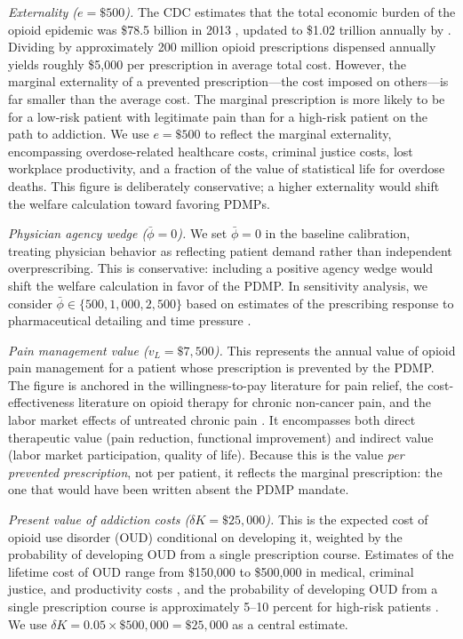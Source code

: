 \documentclass[12pt]{article}
\begin{document}
\textit{Externality ($e = \$500$).} The CDC estimates that the total economic burden of the opioid epidemic was \$78.5 billion in 2013 \citep{florence2016economic}, updated to \$1.02 trillion annually by \citet{florence2021economic}. Dividing by approximately 200 million opioid prescriptions dispensed annually yields roughly \$5,000 per prescription in average total cost. However, the marginal externality of a prevented prescription---the cost imposed on others---is far smaller than the average cost. The marginal prescription is more likely to be for a low-risk patient with legitimate pain than for a high-risk patient on the path to addiction. We use $e = \$500$ to reflect the marginal externality, encompassing overdose-related healthcare costs, criminal justice costs, lost workplace productivity, and a fraction of the value of statistical life for overdose deaths. This figure is deliberately conservative; a higher externality would shift the welfare calculation toward favoring PDMPs.

\textit{Physician agency wedge ($\bar{\phi} = 0$).} We set $\bar{\phi} = 0$ in the baseline calibration, treating physician behavior as reflecting patient demand rather than independent overprescribing. This is conservative: including a positive agency wedge would shift the welfare calculation in favor of the PDMP. In sensitivity analysis, we consider $\bar{\phi} \in \{500, 1{,}000, 2{,}500\}$ based on estimates of the prescribing response to pharmaceutical detailing and time pressure \citep{schnell2017physician}.

\textit{Pain management value ($v_L = \$7{,}500$).} This represents the annual value of opioid pain management for a patient whose prescription is prevented by the PDMP. The figure is anchored in the willingness-to-pay literature for pain relief, the cost-effectiveness literature on opioid therapy for chronic non-cancer pain, and the labor market effects of untreated chronic pain \citep{finkelstein2019take}. It encompasses both direct therapeutic value (pain reduction, functional improvement) and indirect value (labor market participation, quality of life). Because this is the value \textit{per prevented prescription}, not per patient, it reflects the marginal prescription: the one that would have been written absent the PDMP mandate.

\textit{Present value of addiction costs ($\delta K = \$25{,}000$).} This is the expected cost of opioid use disorder (OUD) conditional on developing it, weighted by the probability of developing OUD from a single prescription course. Estimates of the lifetime cost of OUD range from \$150,000 to \$500,000 in medical, criminal justice, and productivity costs \citep{florence2021economic}, and the probability of developing OUD from a single prescription course is approximately 5--10 percent for high-risk patients \citep{volkow2016opioid}. We use $\delta K = 0.05 \times \$500{,}000 = \$25{,}000$ as a central estimate.
\end{document}
